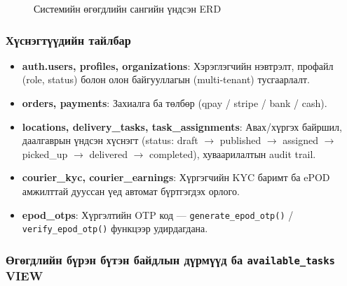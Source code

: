 \begin{figure}[H]
{
}%
\caption{Системийн өгөгдлийн сангийн үндсэн ERD}
\label{fig:core_erd}
\end{figure}

\subsubsection{Хүснэгтүүдийн тайлбар}

\begin{itemize}
  \item \textbf{auth.users, profiles, organizations}: Хэрэглэгчийн нэвтрэлт, профайл (role, status) болон олон байгууллагын (multi-tenant) тусгаарлалт.
  \item \textbf{orders, payments}: Захиалга ба төлбөр (qpay / stripe / bank / cash).
  \item \textbf{locations, delivery\_tasks, task\_assignments}: Авах/хүргэх байршил, даалгаврын үндсэн хүснэгт (status: draft $\rightarrow$ published $\rightarrow$ assigned $\rightarrow$ picked\_up $\rightarrow$ delivered $\rightarrow$ completed), хуваарилалтын audit trail.
  \item \textbf{courier\_kyc, courier\_earnings}: Хүргэгчийн KYC баримт ба ePOD амжилттай дууссан үед автомат бүртгэгдэх орлого.
  \item \textbf{epod\_otps}: Хүргэлтийн OTP код — \texttt{generate\_epod\_otp()} / \texttt{verify\_epod\_otp()} функцээр удирдагдана.
\end{itemize}

\subsubsection{Өгөгдлийн бүрэн бүтэн байдлын дүрмүүд ба \texttt{available\_tasks} VIEW}

